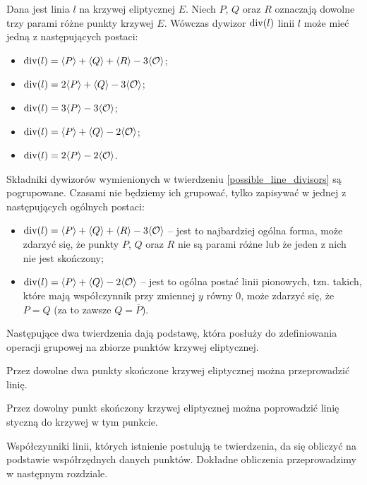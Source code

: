 \begin{theorem}\label{possible_line_divisors}
Dana jest linia $l$ na krzywej eliptycznej $E$.
Niech $P$, $Q$ oraz $R$ oznaczają dowolne trzy parami różne punkty krzywej $E$.
Wówczas dywizor $\operatorname{div}(l)$ linii $l$ może mieć jedną z następujących postaci:
\begin{itemize}
\item $\operatorname{div}(l) = \langle P\rangle + \langle Q\rangle + \langle R\rangle - 3\langle\mathcal{O}\rangle$;
\item $\operatorname{div}(l) = 2\langle P\rangle + \langle Q\rangle - 3\langle\mathcal{O}\rangle$;
\item $\operatorname{div}(l) = 3\langle P\rangle - 3\langle\mathcal{O}\rangle$;
\item $\operatorname{div}(l) = \langle P\rangle + \langle Q\rangle - 2\langle\mathcal{O}\rangle$;
\item $\operatorname{div}(l) = 2\langle P\rangle - 2\langle\mathcal{O}\rangle$.
\end{itemize}
\end{theorem}

\begin{remark}
Składniki dywizorów wymienionych w twierdzeniu \ref{possible_line_divisors}
są pogrupowane. Czasami nie będziemy ich grupować,
tylko zapisywać w jednej z następujących ogólnych postaci:
\begin{itemize}
\item $\operatorname{div}(l) = \langle P\rangle + \langle Q\rangle + \langle R\rangle - 3\langle\mathcal{O}\rangle$ --
jest to najbardziej ogólna forma,
może zdarzyć się, że punkty $P$, $Q$ oraz $R$ nie są parami różne
lub że jeden z nich nie jest skończony;
\item $\operatorname{div}(l) = \langle P\rangle + \langle Q\rangle - 2\langle\mathcal{O}\rangle$ --
jest to ogólna postać linii pionowych,
tzn. takich, które mają współczynnik przy zmiennej $y$ równy $0$,
może zdarzyć się, że $P = Q$ (za to zawsze $Q = \overline{P}$).
\end{itemize}
\end{remark}

Następujące dwa twierdzenia dają podstawę,
która posłuży do zdefiniowania operacji grupowej
na zbiorze punktów krzywej eliptycznej.

\begin{theorem}\label{line_through_two_points_theorem}
Przez dowolne dwa punkty skończone krzywej eliptycznej
można przeprowadzić linię.
\end{theorem}

\begin{theorem}\label{line_tangent_at_point_theorem}
Przez dowolny punkt skończony krzywej eliptycznej
można poprowadzić linię
styczną do krzywej w tym punkcie.
\end{theorem}

Współczynniki linii, których istnienie postulują te twierdzenia,
da się obliczyć na podstawie współrzędnych danych punktów.
Dokładne obliczenia przeprowadzimy w następnym rozdziale.

